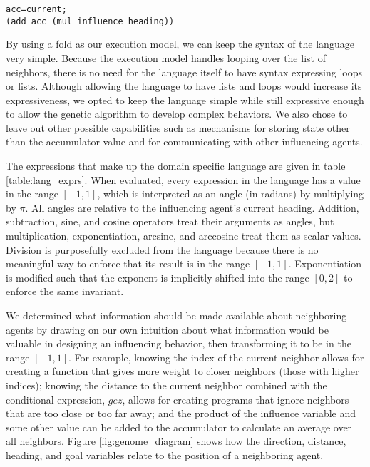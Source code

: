 \begin{lstlisting}[caption={A small genome that sets the agent's heading to the
average of its neighbors' headings},captionpos=b,label={listing:example_genome}]
acc=current;
(add acc (mul influence heading))
\end{lstlisting}

By using a fold as our execution model, we can keep the syntax of the language
very simple.
Because the execution model handles looping over the list of neighbors, there
is no need for the language itself to have syntax expressing loops or lists.
Although allowing the language to have lists and loops would increase its
expressiveness, we opted to keep the language simple while still expressive
enough to allow the genetic algorithm to develop complex behaviors.
We also chose to leave out other possible capabilities such as mechanisms for
storing state other than the accumulator value and for communicating with other
influencing agents.

The expressions that make up the domain specific language are given in table
\ref{table:lang_exprs}.
When evaluated, every expression in the language has a value in the range
$[-1,1]$, which is interpreted as an angle (in radians) by multiplying by
$\pi$.
All angles are relative to the influencing agent's current heading.
Addition, subtraction, sine, and cosine operators treat their arguments as
angles, but multiplication, exponentiation, arcsine, and arccosine treat them
as scalar values.
Division is purposefully excluded from the language because there is no
meaningful way to enforce that its result is in the range $[-1, 1]$.
Exponentiation is modified such that the exponent is implicitly shifted into
the range $[0, 2]$ to enforce the same invariant.

We determined what information should be made available about neighboring
agents by drawing on our own intuition about what information would be valuable
in designing an influencing behavior, then transforming it to be in the range
$[-1, 1]$.
For example, knowing the index of the current neighbor allows for creating a
function that gives more weight to closer neighbors (those with higher indices);
knowing the distance to the current neighbor combined with the conditional
expression, $gez$, allows for creating programs that ignore neighbors that are
too close or too far away;
and the product of the influence variable and some other value can be added to
the accumulator to calculate an average over all neighbors.
Figure \ref{fig:genome_diagram} shows how the direction, distance, heading, and
goal variables relate to the position of a neighboring agent.

